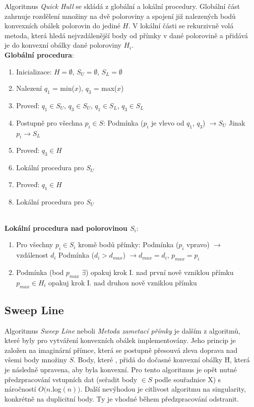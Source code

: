 \documentclass[a4paper, 12pt]{article}
\begin{document}
Algoritmus \textit{Quick Hull} se skládá z globální a lokální procedury. Globální část zahrnuje rozdělení množiny na dvě poloroviny a spojení již nalezených bodů konvexních obálek polorovin do jediné $H$. V lokální části se rekurzivně volá metoda, která hledá nejvzdálenější body od přímky v dané polorovině a přidává je do konvexní obálky dané poloroviny $H_i$.\\

\textbf{Globální procedura}:
\begin{enumerate}
\item Inicializace: $H = \emptyset$, $S_U = \emptyset$, $S_L = \emptyset$ 
\item Nalezení $q_1$ = min($x$), $q_3$ = max($x$)
\item Proveď: $q_1 \in S_U$, $q_3 \in S_U$, $q_1 \in S_L$, $q_3 \in S_L$
\item Postupně pro všechna $p_i \in S$:
\subitem Podmínka ($p_i$ je vlevo od $q_1$, $q_3$) $\rightarrow S_U$
\subitem Jinak $ p_i \rightarrow S_L$
\item Proveď: $q_3 \in H$
\item Lokální procedura pro $S_U$
\item Proveď: $q_1 \in H$
\item Lokální procedura pro $S_U$
\end{enumerate}
~\\
\textbf{Lokální procedura nad polorovinou $S_i$}:
\begin{enumerate}[label=\Roman*.]
\item Pro všechny $p_i \in S_i$ kromě bodů přímky:
\subitem Podmínka ($p_i$ vpravo) $\rightarrow$ vzdálenost $d_i$
\subsubitem Podmínka ($d_i > d_{max}$) $\rightarrow d_{max} = d_i$, $p_{max} = p_i$
\item Podmínka (bod $p_{max}$ $\exists$) 
\subitem opakuj krok I. nad první nově vzniklou přímku
\subitem $p_{max} \in H_i$
\subitem opakuj krok I. nad druhou nově vzniklou přímku
\end{enumerate}

\subsection{Sweep Line}
Algoritmus \textit{Sweep Line} neboli \textit{Metoda zametací přímky} je dalším z algoritmů, které byly pro vytváření konvexních obálek implementovány. Jeho princip je založen na imaginární přímce, která se postupně přesouvá zleva doprava nad všemi body množiny $S$. Body, které , přidá do dočasné konvexní obálky \={H}, která je následně upravena, aby byla konvexní. Pro tento algoritmus je opět nutné předzpracování vstupních dat (seřadit body $\in S$ podle souřadnice X) s náročností $O(n.$log$(n))$. Další nevýhodou je citlivost algoritmu na singularity, konkrétně na duplicitní body. Ty je vhodné během předzpracování odstranit.\\ 
\end{document}
